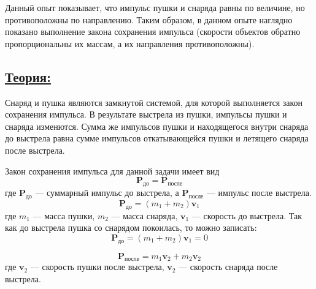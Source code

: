 \documentclass[14pt,a4paper,oneside]{extarticle}	%
\begin{document}
Данный опыт показывает, что импульс пушки и снаряда равны по величине, но противоположны по направлению.
Таким образом, в данном опыте наглядно показано выполнение закона сохранения импульса (скорости объектов обратно пропорциональны их массам, а их направления противоположны).

\newpage
\subsection*{\underline{Теория:}}

Снаряд и пушка являются замкнутой системой, для которой выполняется закон сохранения импульса. 
В результате выстрела из пушки, импульсы пушки и снаряда изменются.
Сумма же импульсов пушки и находящегося внутри снаряда до выстрела равна сумме импульсов откатывающейся пушки и летящего снаряда после выстрела.

Закон сохранения импульса для данной задачи имеет вид 
\begin{equation}\label{cannon-eq1}
 \textbf{P}_{\text{до}} = \textbf{P}_{\text{после}}
\end{equation}
где $ \textbf{P}_{\text{до}} $ — суммарный импульс до выстрела, а $ \textbf{P}_{\text{после}} $ — импульс после выстрела. 
\begin{equation}\label{cannon-eq2}
\textbf{P}_{\text{до}} = (m_{1} + m_{2})\textbf{v}_{1}
\end{equation}
где $ m_{1} $ — масса пушки, $ m_{2} $ — масса снаряда, $ \textbf{v}_{1} $ — скорость до выстрела.
Так как до выстрела пушка со снарядом покоилась, то можно записать: 
\begin{equation}\label{cannon-eq3}
\textbf{P}_{\text{до}} = (m_{1} + m_{2})\textbf{v}_{1} = 0
\end{equation}

\begin{equation}\label{cannon-eq4}
\textbf{P}_{\text{после}} = m_{1}\textbf{v}_{2} + m_{2}\textbf{v}_{2} 
\end{equation}
где $ \textbf{v}_{2} $ — скорость пушки после выстрела, $ \textbf{v}_{2} $ — скорость снаряда после выстрела.
\end{document}
